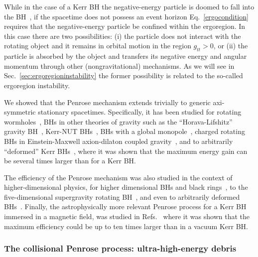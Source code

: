 \documentclass[11pt]{article}
\numberwithin{equation}{section} %
\begin{document}
While in the case of a Kerr BH the negative-energy particle is doomed to fall into the BH~\cite{Contopoulos1984}, if the spacetime does not possess an event horizon Eq.~\eqref{ergocondition} requires that the negative-energy particle be confined within the ergoregion. In this case there are two possibilities: (i) the particle does not interact with the rotating object and it remains in orbital motion in the region $g_{tt}>0$, or (ii) the particle is absorbed by the object and transfers its negative energy and angular momentum through other (nongravitational) mechanisms. 
As we will see in Sec.~\ref{sec:ergoregioninstability} the former possibility is related to the so-called ergoregion instability.

We showed that the Penrose mechanism extends trivially to generic axi-symmetric
stationary spacetimes. Specifically, it has been studied for
rotating wormholes~\cite{Teo:1998dp}, BHs in other theories of gravity such as the ``Horava-Lifshitz'' gravity BH~\cite{Abdujabbarov:2011af}, Kerr-NUT BHs~\cite{Abdujabbarov:2011uv}, BHs with a global monopole~\cite{Chen:2013vja}, charged rotating BHs in Einstein-Maxwell axion-dilaton coupled gravity~\cite{Ganguly:2014pwa}, and to arbitrarily ``deformed'' Kerr BHs~\cite{Liu:2012qe}, where it was shown that the maximum energy gain can be several times larger than for a Kerr BH.

The efficiency of the Penrose mechanism was also studied in the context of higher-dimensional physics,
for higher dimensional BHs and black rings~\cite{Nozawa:2005eu}, to the five-dimensional supergravity rotating BH~\cite{Prabhu:2009ju}, 
and even to arbitrarily deformed BHs~\cite{Ghosh:2013ona}. Finally, the astrophysically more relevant Penrose process for a Kerr BH immersed in a magnetic field, was studied in Refs.~\cite{1986ApJ...307...38P,Wagh:1986tsa,1986ApJ...301.1018W,Wagh:1989zqa} where it was shown that the maximum efficiency could be up to ten times larger than in a vacuum Kerr BH.

\subsubsection{The collisional Penrose process: ultra-high-energy debris}\label{super_penrose}
\end{document}

